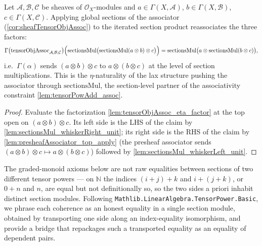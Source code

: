\begin{lemma}

  \label{lem:tensorObjAssoc_hom_sectionsMul}
  Let \(\mathcal{A}, \mathcal{B}, \mathcal{C}\) be sheaves of
  \(\mathcal{O}_X\)-modules and \(a \in \Gamma(X,\mathcal{A})\),
  \(b \in \Gamma(X,\mathcal{B})\), \(c \in \Gamma(X,\mathcal{C})\). Applying global
  sections of the associator (\cref{cor:sheafTensorObjAssoc}) to the iterated
  section product reassociates the three factors:
  \[
    \Gamma\bigl(\mathrm{tensorObjAssoc}_{\mathcal{A},\mathcal{B},\mathcal{C}}\bigr)
      \Bigl(\mathrm{sectionsMul}\bigl(
        \mathrm{sectionsMul}(a \otimes b) \otimes c\bigr)\Bigr)
      = \mathrm{sectionsMul}\bigl(a \otimes \mathrm{sectionsMul}(b \otimes c)\bigr),
  \]
  i.e.\ \(\Gamma(\alpha)\) sends \((a \otimes b) \otimes c\) to
  \(a \otimes (b \otimes c)\) at the level of section multiplications. This is the
  \(\eta\)-naturality of the lax structure pushing the associator through
  \(\mathrm{sectionsMul}\), the section-level partner of the associativity
  constraint \cref{lem:tensorPowAdd_assoc}.
\end{lemma}

\begin{proof}
  \leanok
  Evaluate the factorization \cref{lem:tensorObjAssoc_eta_factor} at the top open on
  \((a \otimes b) \otimes c\). Its left side is the LHS of the claim by
  \cref{lem:sectionsMul_whiskerRight_unit}; its right side is the RHS of the claim
  by \cref{lem:presheafAssociator_top_apply} (the presheaf associator sends
  \((a \otimes b) \otimes c \mapsto a \otimes (b \otimes c)\)) followed by
  \cref{lem:sectionsMul_whiskerLeft_unit}.
\end{proof}

The graded-monoid axioms below are not raw equalities between sections of two
different tensor powers --- on \(\mathbb{N}\) the indices \((i+j)+k\) and
\(i+(j+k)\), or \(0+n\) and \(n\), are equal but not definitionally so, so the two
sides a priori inhabit distinct section modules. Following
\texttt{Mathlib.LinearAlgebra.TensorPower.Basic}, we phrase each coherence as an
honest equality in a single section module, obtained by transporting one side
along an index-equality isomorphism, and provide a bridge that repackages such a
transported equality as an equality of dependent pairs.


